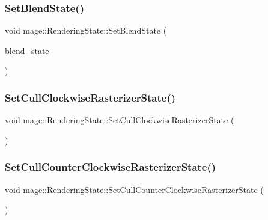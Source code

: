 \hypertarget{structmage_1_1_rendering_state_a6f5c6b0bf031db9c3cf255356b4f383a}{}\label{structmage_1_1_rendering_state_a6f5c6b0bf031db9c3cf255356b4f383a} 
\subsubsection{\texorpdfstring{Set\+Blend\+State()}{SetBlendState()}}
{\footnotesize\ttfamily void mage\+::\+Rendering\+State\+::\+Set\+Blend\+State (\begin{DoxyParamCaption}\item[{I\+D3\+D11\+Blend\+State $\ast$}]{blend\+\_\+state }\end{DoxyParamCaption})}

\hypertarget{structmage_1_1_rendering_state_a707034239265916d82e7dbe168f09cb6}{}\label{structmage_1_1_rendering_state_a707034239265916d82e7dbe168f09cb6} 
\subsubsection{\texorpdfstring{Set\+Cull\+Clockwise\+Rasterizer\+State()}{SetCullClockwiseRasterizerState()}}
{\footnotesize\ttfamily void mage\+::\+Rendering\+State\+::\+Set\+Cull\+Clockwise\+Rasterizer\+State (\begin{DoxyParamCaption}{ }\end{DoxyParamCaption})}

\hypertarget{structmage_1_1_rendering_state_aa66215168ce8752ef20065b161bad1fc}{}\label{structmage_1_1_rendering_state_aa66215168ce8752ef20065b161bad1fc} 
\subsubsection{\texorpdfstring{Set\+Cull\+Counter\+Clockwise\+Rasterizer\+State()}{SetCullCounterClockwiseRasterizerState()}}
{\footnotesize\ttfamily void mage\+::\+Rendering\+State\+::\+Set\+Cull\+Counter\+Clockwise\+Rasterizer\+State (\begin{DoxyParamCaption}{ }\end{DoxyParamCaption})}


